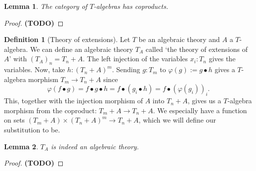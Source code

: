 \documentclass[a4paper]{amsbook}
\newtheorem{lemma}{Lemma}
\theoremstyle{definition}
\newtheorem{definition}{Definition}
\theoremstyle{remark}
\newcommand\TODO{\textbf{(TODO)} }
\begin{document}
  \begin{lemma}
    The category of $ T $-algebras has coproducts.
  \end{lemma}
  \begin{proof}
    \TODO
  \end{proof}

  \begin{definition}[Theory of extensions]
    Let $ T $ be an algebraic theory and $ A $ a $ T $-algebra. We can define an algebraic theory $ T_A $ called `the theory of extensions of $ A $' with $ (T_A)_n = T_n + A $. The left injection of the variables $ x_i : T_n $ gives the variables.
    Now, take $ h: (T_n + A)^m $. Sending $ g: T_m $ to $ \varphi(g) := g \bullet h $ gives a $ T $-algebra morphism $ T_m \to T_n + A $ since
    \[ \varphi(f \bullet g) = f \bullet g \bullet h = f \bullet (g_i \bullet h) = f \bullet (\varphi(g_i))_i. \]
    This, together with the injection morphism of $ A $ into $ T_n + A $, gives us a $ T $-algebra morphism from the coproduct: $ T_m + A \to T_n + A $. We especially have a function on sets $ (T_m + A) \times (T_n + A)^m \to T_n + A $, which we will define our substitution to be.
  \end{definition}

  \begin{lemma}
    $ T_A $ is indeed an algebraic theory.
  \end{lemma}
  \begin{proof}
    \TODO
  \end{proof}

  
  
\end{document}
